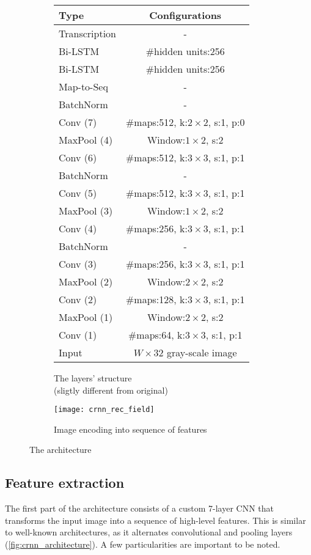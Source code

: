 		\begin{figure}
		\begin{subfigure}[b]{.48\linewidth}
		\begin{flushleft}
		\footnotesize
		\begin{tabular}{|l|c|}
			\hline
			\textbf{Type} & \textbf{Configurations}						\tabularnewline	\hline
																																				\hline
			Transcription & - 																\tabularnewline	\hline
			Bi-LSTM & \#hidden units:256						\tabularnewline	\hline
			Bi-LSTM & \#hidden units:256						\tabularnewline	\hline
			Map-to-Seq & - 															\tabularnewline	\hline
			BatchNorm & - 														\tabularnewline	\hline
			Conv (7) & \#maps:512, k:$2\times2$, s:1, p:0	\tabularnewline	\hline
			MaxPool (4) & Window:$1\times2$, s:2								\tabularnewline	\hline
			Conv (6) & \#maps:512, k:$3\times3$, s:1, p:1	\tabularnewline	\hline
			BatchNorm & - 														\tabularnewline	\hline
			Conv (5) & \#maps:512, k:$3\times3$, s:1, p:1	\tabularnewline	\hline
			MaxPool (3) & Window:$1\times2$, s:2 							\tabularnewline	\hline
			Conv (4) & \#maps:256, k:$3\times3$, s:1, p:1	\tabularnewline	\hline
			BatchNorm & - 														\tabularnewline	\hline
			Conv (3) & \#maps:256, k:$3\times3$, s:1, p:1	\tabularnewline	\hline
			MaxPool (2) & Window:$2\times2$, s:2								\tabularnewline	\hline
			Conv (2) & \#maps:128, k:$3\times3$, s:1, p:1	\tabularnewline	\hline
			MaxPool (1) & Window:$2\times2$, s:2 							\tabularnewline	\hline
			Conv (1) & \#maps:64, k:$3\times3$, s:1, p:1		\tabularnewline	\hline
			Input & $W\times32$ gray-scale image 							\tabularnewline	\hline
		\end{tabular}\par
		\caption{The layers' structure\\\footnotesize (sligtly different from original)}\label{fig:crnn_architecture}
		\end{flushleft}
		\end{subfigure}
		\begin{subfigure}[b]{.49\linewidth}
			\texttt{[image: crnn\_rec\_field]}
			\caption{Image encoding into sequence of features \footnotesize\citep[credit to][]{CRNN}}\label{fig:crnn_sequence}
		\end{subfigure}
		\caption{The \CRNN{} architecture}
		\end{figure}

	\subsection{Feature extraction}
		The first part of the \CRNN{} architecture consists of a custom 7-layer CNN that transforms the input image into a sequence of high-level features. This is similar to well-known architectures, as it alternates convolutional and pooling layers (\autoref{fig:crnn_architecture}). A few particularities are important to be noted.

